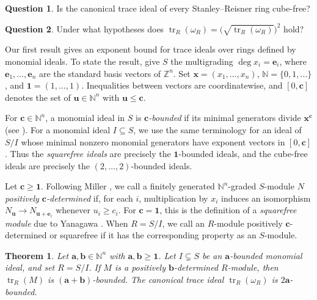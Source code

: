 \documentclass[a4paper,11pt]{amsart}
\theoremstyle{plain}
\newtheorem{maintheorema}{Theorem}
\theoremstyle{definition}
\newtheorem{introquestion}{Question}
\theoremstyle{remark}
\DeclareMathOperator{\tr}{tr}
\newcommand{\NN}{\mathbb N}
\newcommand{\ZZ}{\mathbb Z}
\newcommand{\ee}{\mathbf e}
\newcommand{\one}{\mathbf1}
\begin{document}
\begin{introquestion}\label{qu:cube-free}
Is the canonical trace ideal of every Stanley--Reisner ring cube-free?
\end{introquestion}

\begin{introquestion}\label{qu:square}
Under what hypotheses does $\tr_R(\omega_R)=\bigl(\sqrt{\tr_R(\omega_R)}\bigr)^2$ hold?
\end{introquestion}

Our first result gives an exponent bound for trace ideals over rings defined by monomial ideals. To state the result, give $S$ the multigrading $\deg x_i=\ee_i$, where $\ee_1,\ldots,\ee_n$ are the standard basis vectors of $\ZZ^n$. Set $\mathbf{x}=(x_1,\ldots,x_n)$, $\NN=\{0,1,\ldots\}$, and $\one=(1,\ldots,1)$. Inequalities between vectors are coordinatewise, and $[0,\mathbf{c}]$ denotes the set of $\mathbf{u}\in\NN^n$ with $\mathbf{u}\leq\mathbf{c}$.

For $\mathbf{c}\in\NN^n$, a monomial ideal in $S$ is \emph{$\mathbf{c}$-bounded} if its minimal generators divide $\mathbf{x}^{\mathbf{c}}$ (see \cite[Section~1]{AHZ22}). For a monomial ideal $I\subseteq S$, we use the same terminology for an ideal of $S/I$ whose minimal nonzero monomial generators have exponent vectors in $[0,\mathbf{c}]$. Thus the \emph{squarefree ideals} are precisely the $\one$-bounded ideals, and the cube-free ideals are precisely the $(2,\ldots,2)$-bounded ideals.

Let $\mathbf{c}\geq\one$. Following Miller \cite[Definition~2.1]{Mil00}, we call a finitely generated $\NN^n$-graded $S$-module $N$ \emph{positively $\mathbf{c}$-determined} if, for each $i$, multiplication by $x_i$ induces an isomorphism $N_{\mathbf{u}}\to N_{\mathbf{u}+\ee_i}$ whenever $u_i\geq c_i$. For $\mathbf{c}=\one$, this is the definition of a \emph{squarefree module} due to Yanagawa \cite[Definition~2.1]{Yan00}. When $R=S/I$, we call an $R$-module positively $\mathbf{c}$-determined or squarefree if it has the corresponding property as an $S$-module.

\begin{maintheorema}\label{thm:main-a}
Let $\mathbf{a},\mathbf{b}\in\NN^n$ with $\mathbf{a},\mathbf{b}\geq\one$. Let $I\subsetneq S$ be an $\mathbf{a}$-bounded monomial ideal, and set $R=S/I$. If $M$ is a positively $\mathbf{b}$-determined $R$-module, then $\tr_R(M)$ is $(\mathbf{a}+\mathbf{b})$-bounded. The canonical trace ideal $\tr_R(\omega_R)$ is $2\mathbf{a}$-bounded.
\end{maintheorema}
\end{document}
